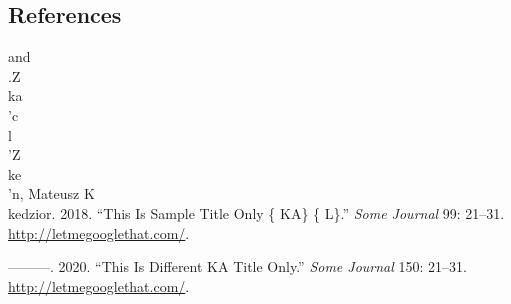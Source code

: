 \documentclass[]{article}
\begin{document}
\subsection*{References}\label{references}

\hypertarget{refs}{}
\hypertarget{ref-SampleTitle2016}{}
and\\
.Z\\
ka\\
'c\\
l\\
'Z\\
ke\\
'n, Mateusz K\\
kedzior. 2018. ``This Is Sample Title Only \{ KA\} \{ L\}.'' \emph{Some
Journal} 99: 21--31. \url{http://letmegooglethat.com/}.

\hypertarget{ref-OtherTitle2010}{}
---------. 2020. ``This Is Different KA Title Only.'' \emph{Some
Journal} 150: 21--31. \url{http://letmegooglethat.com/}.
\end{document}
